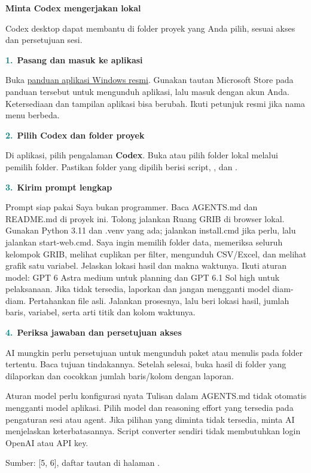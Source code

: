\documentclass[11pt,a4paper]{article}
\newcommand{\step}[2]{\par\addvspace{2mm}\noindent\textcolor{teal}{\textbf{#1.}}\ \textbf{#2}\par\nobreak}
\newcommand{\pagetitle}[3]{\clearpage{\color{teal}\small\bfseries LANGKAH #1}\par{\color{slate}\LARGE\bfseries #2}\par\vspace{2mm}#3\par\vspace{3mm}}
\newcommand{\source}[1]{{\footnotesize\color{blue}Sumber: [#1], daftar tautan di halaman \pageref{pg:references}.}\par}
\begin{document}
\pagetitle{12}{Minta Codex mengerjakan lokal}{Codex desktop dapat membantu di folder proyek yang Anda pilih, sesuai akses dan persetujuan sesi.}
\label{pg:codex}
\step{1}{Pasang dan masuk ke aplikasi}
Buka \href{https://learn.chatgpt.com/docs/windows/windows-app}{panduan aplikasi Windows resmi}.
Gunakan tautan Microsoft Store pada panduan tersebut untuk mengunduh aplikasi,
lalu masuk dengan akun Anda. Ketersediaan dan tampilan aplikasi bisa berubah.
Ikuti petunjuk resmi jika nama menu berbeda.
\step{2}{Pilih Codex dan folder proyek}
Di aplikasi, pilih pengalaman \textbf{Codex}. Buka atau pilih folder lokal
 melalui pemilih folder. Pastikan folder
yang dipilih berisi script, , dan .
\step{3}{Kirim prompt lengkap}
\begin{panel}{Prompt siap pakai}
Saya bukan programmer. Baca AGENTS.md dan README.md di proyek ini. Tolong
jalankan Ruang GRIB di browser lokal. Gunakan Python 3.11 dan .venv yang ada;
jalankan install.cmd jika perlu, lalu jalankan start-web.cmd.
Saya ingin memilih folder data, memeriksa seluruh kelompok GRIB,
melihat cuplikan per filter, mengunduh CSV/Excel,
dan melihat grafik satu variabel. Jelaskan lokasi hasil dan makna waktunya.
Ikuti aturan model: GPT 6 Astra medium untuk planning dan GPT 6.1 Sol high
untuk pelaksanaan. Jika tidak tersedia, laporkan dan jangan mengganti
model diam-diam. Pertahankan file asli. Jalankan prosesnya, lalu beri lokasi
hasil, jumlah baris, variabel, serta arti titik dan kolom waktunya.
\end{panel}
\step{4}{Periksa jawaban dan persetujuan akses}
AI mungkin perlu persetujuan untuk mengunduh paket atau menulis pada folder
tertentu. Baca tujuan tindakannya. Setelah selesai, buka hasil di folder yang
dilaporkan dan cocokkan jumlah baris/kolom dengan laporan.
\begin{panel}{Aturan model perlu konfigurasi nyata}
Tulisan dalam AGENTS.md tidak otomatis mengganti model aplikasi. Pilih model
dan reasoning effort yang tersedia pada pengaturan sesi atau agent. Jika
pilihan yang diminta tidak tersedia, minta AI menjelaskan keterbatasannya.
Script converter sendiri tidak membutuhkan login OpenAI atau API key.
\end{panel}
\source{5, 6}
\end{document}
